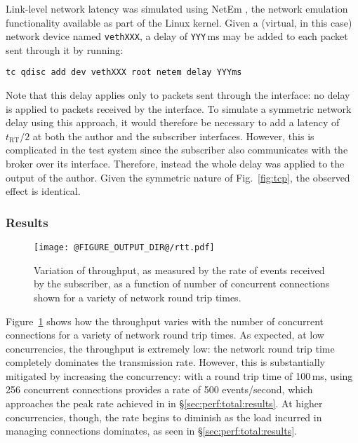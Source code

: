 \documentclass[5p,authoryear]{elsarticle}
\begin{document}
Link-level network latency was simulated using NetEm \citep{Hemminger:2005},
the network emulation functionality available as part of the Linux kernel.
Given a (virtual, in this case) network device named \texttt{vethXXX}, a
delay of \texttt{YYY}\,ms may be added to each packet sent through it by
running:
\begin{verbatim}
tc qdisc add dev vethXXX root netem delay YYYms
\end{verbatim}
Note that this delay applies only to packets sent through the interface: no
delay is applied to packets received by the interface. To simulate a symmetric
network delay using this approach, it would therefore be necessary to add a
latency of $t_\mathrm{RT} / 2$ at both the author and the subscriber
interfaces. However, this is complicated in the test system since the
subscriber also communicates with the broker over its interface. Therefore,
instead the whole delay was applied to the output of the author. Given the
symmetric nature of Fig.~\ref{fig:tcp}, the observed effect is identical.

\subsubsection{Results}

\begin{figure}
  \begin{center}
  \texttt{[image: @FIGURE\_OUTPUT\_DIR@/rtt.pdf]}
  \end{center}

  \caption{Variation of throughput, as measured by the rate of events received
  by the subscriber, as a function of number of concurrent connections shown
  for a variety of network round trip times.}

  \label{fig:rtt}
\end{figure}

Figure~\ref{fig:rtt} shows how the throughput varies with the number of
concurrent connections for a variety of network round trip times. As expected,
at low concurrencies, the throughput is extremely low: the network round trip
time completely dominates the transmission rate. However, this is
substantially mitigated by increasing the concurrency: with a round trip time
of 100\,ms, using 256 concurrent connections provides a rate of 500
events/second, which approaches the peak rate achieved in in
\S\ref{sec:perf:total:results}. At higher concurrencies, though, the rate
begins to diminish as the load incurred in managing connections dominates,
as seen in \S\ref{sec:perf:total:results}.
\end{document}
